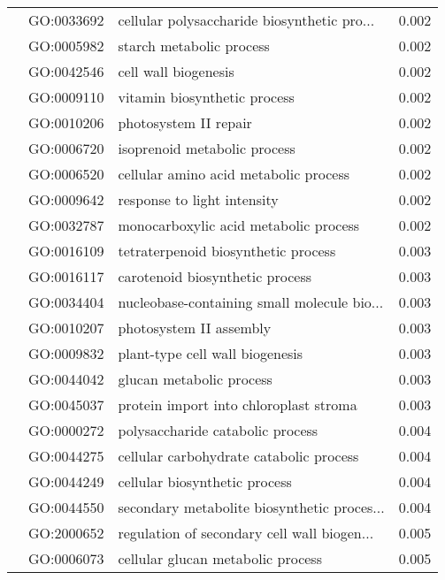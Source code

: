 \begin{longtable}{lllr}
   & GO:0033692 &  cellular polysaccharide biosynthetic pro... &         0.002 \\
   & GO:0005982 &                     starch metabolic process &         0.002 \\
   & GO:0042546 &                         cell wall biogenesis &         0.002 \\
   & GO:0009110 &                 vitamin biosynthetic process &         0.002 \\
   & GO:0010206 &                        photosystem II repair &         0.002 \\
   & GO:0006720 &                 isoprenoid metabolic process &         0.002 \\
   & GO:0006520 &        cellular amino acid metabolic process &         0.002 \\
   & GO:0009642 &                  response to light intensity &         0.002 \\
   & GO:0032787 &        monocarboxylic acid metabolic process &         0.002 \\
   & GO:0016109 &          tetraterpenoid biosynthetic process &         0.003 \\
   & GO:0016117 &              carotenoid biosynthetic process &         0.003 \\
   & GO:0034404 &  nucleobase-containing small molecule bio... &         0.003 \\
   & GO:0010207 &                      photosystem II assembly &         0.003 \\
   & GO:0009832 &              plant-type cell wall biogenesis &         0.003 \\
   & GO:0044042 &                     glucan metabolic process &         0.003 \\
   & GO:0045037 &       protein import into chloroplast stroma &         0.003 \\
   & GO:0000272 &             polysaccharide catabolic process &         0.004 \\
   & GO:0044275 &      cellular carbohydrate catabolic process &         0.004 \\
   & GO:0044249 &                cellular biosynthetic process &         0.004 \\
   & GO:0044550 &  secondary metabolite biosynthetic proces... &         0.004 \\
   & GO:2000652 &  regulation of secondary cell wall biogen... &         0.005 \\
   & GO:0006073 &            cellular glucan metabolic process &         0.005 \\

\end{longtable}
